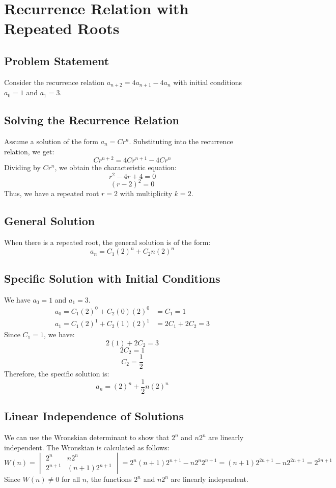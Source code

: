 \documentclass{report}
\begin{document}
\section{Recurrence Relation with Repeated Roots}

\subsection{Problem Statement}

Consider the recurrence relation $a_{n+2} = 4a_{n+1} - 4a_n$ with initial conditions $a_0 = 1$ and $a_1 = 3$.

\subsection{Solving the Recurrence Relation}

Assume a solution of the form $a_n = Cr^n$. Substituting into the recurrence relation, we get:
$$Cr^{n+2} = 4Cr^{n+1} - 4Cr^n$$
Dividing by $Cr^n$, we obtain the characteristic equation:
$$r^2 - 4r + 4 = 0$$
$$(r-2)^2 = 0$$
Thus, we have a repeated root $r = 2$ with multiplicity $k = 2$.

\subsection{General Solution}

When there is a repeated root, the general solution is of the form:
$$a_n = C_1(2)^n + C_2n(2)^n$$

\subsection{Specific Solution with Initial Conditions}

We have $a_0 = 1$ and $a_1 = 3$.
\begin{align*}
	a_0 = C_1(2)^0 + C_2(0)(2)^0 & = C_1 = 1         \\
	a_1 = C_1(2)^1 + C_2(1)(2)^1 & = 2C_1 + 2C_2 = 3
\end{align*}
Since $C_1 = 1$, we have:
$$2(1) + 2C_2 = 3$$
$$2C_2 = 1$$
$$C_2 = \frac{1}{2}$$
Therefore, the specific solution is:
$$a_n = (2)^n + \frac{1}{2}n(2)^n$$

\subsection{Linear Independence of Solutions}
\sol
We can use the Wronskian determinant to show that $2^n$ and $n2^n$ are linearly independent.  The Wronskian is calculated as follows:
$$W(n) = \begin{vmatrix}
		2^n     & n2^n         \\
		2^{n+1} & (n+1)2^{n+1}
	\end{vmatrix} = 2^n(n+1)2^{n+1} - n2^n2^{n+1} = (n+1)2^{2n+1} - n2^{2n+1} = 2^{2n+1}$$
Since $W(n) \neq 0$ for all $n$, the functions $2^n$ and $n2^n$ are linearly independent.
\end{document}
